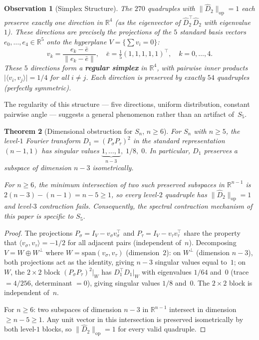 \documentclass[11pt]{article}
\newtheorem{theorem}{Theorem}[section]
\newtheorem{observation}[theorem]{Observation}
\newcommand{\norm}[1]{\lVert #1 \rVert}
\newcommand{\abs}[1]{\lvert #1 \rvert}
\newcommand{\opn}[1]{\norm{#1}_{\mathrm{op}}}
\newcommand{\Dhat}{\widehat{D}}
\begin{document}
\begin{observation}[Simplex Structure]
\label{obs:simplex}
The $270$ quadruples with $\opn{\Dhat_2} = 1$ each preserve exactly one direction
in $\mathbb{R}^4$ (as the eigenvector of $\Dhat_2^\top \Dhat_2$ with eigenvalue $1$).
These directions are precisely the projections of the $5$ standard basis vectors
$e_0, \ldots, e_4 \in \mathbb{R}^5$ onto the hyperplane $V = \{\sum v_i = 0\}$:
\[
v_k = \frac{e_k - \bar{e}}{\norm{e_k - \bar{e}}}, \quad
\bar{e} = \tfrac{1}{5}(1,1,1,1,1)^\top, \quad k = 0, \ldots, 4.
\]
These $5$ directions form a \textbf{regular simplex} in $\mathbb{R}^4$, with
pairwise inner products $\abs{\langle v_i, v_j \rangle} = 1/4$ for all $i \neq j$.
Each direction is preserved by exactly $54$ quadruples (perfectly symmetric).
\end{observation}

The regularity of this structure --- five directions, uniform distribution,
constant pairwise angle --- suggests a general phenomenon rather than
an artifact of~$S_5$.

\begin{theorem}[Dimensional obstruction for $S_n$, $n \geq 6$]
\label{thm:dim-obstruction}
For $S_n$ with $n \geq 5$, the level-$1$ Fourier transform
$D_1 = (P_\sigma P_\tau)^2$ in the standard representation $(n-1,1)$
has singular values $\underbrace{1, \ldots, 1}_{n-3},\; 1/8,\; 0$.
In particular, $D_1$ preserves a subspace of dimension $n-3$ isometrically.

For $n \geq 6$, the minimum intersection of two such preserved subspaces
in $\mathbb{R}^{n-1}$ is $2(n-3)-(n-1) = n-5 \geq 1$, so every level-$2$
quadruple has $\opn{\Dhat_2} = 1$ and level-$3$ contraction fails.
Consequently, the spectral contraction mechanism of this paper is specific
to $S_5$.
\end{theorem}

\begin{proof}
The projections $P_\sigma = I_V - v_\sigma v_\sigma^\top$ and
$P_\tau = I_V - v_\tau v_\tau^\top$ share the property that
$\langle v_\sigma, v_\tau \rangle = -1/2$ for all adjacent pairs
(independent of~$n$). Decomposing $V = W \oplus W^\perp$ where
$W = \mathrm{span}(v_\sigma, v_\tau)$ (dimension~$2$):
on $W^\perp$ (dimension $n-3$), both projections act as the identity,
giving $n-3$ singular values equal to~$1$;
on~$W$, the $2\times 2$ block $(P_\sigma P_\tau)^2\big|_W$ has
$D_1^\top D_1\big|_W$ with eigenvalues $1/64$ and~$0$
(trace $= 4/256$, determinant $= 0$), giving singular values $1/8$ and~$0$.
The $2\times 2$ block is independent of~$n$.

For $n \geq 6$: two subspaces of dimension $n-3$ in $\mathbb{R}^{n-1}$
intersect in dimension $\geq n-5 \geq 1$. Any unit vector in this
intersection is preserved isometrically by both level-$1$ blocks, so
$\opn{\Dhat_2} = 1$ for every valid quadruple.
\end{proof}
\end{document}
